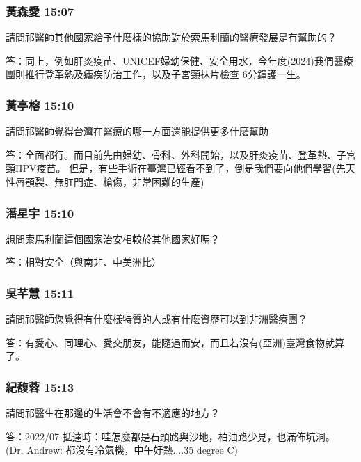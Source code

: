 \documentclass[aspectratio=169]{beamer}
\begin{document}
\begin{frame}
\frametitle{黃森愛 15:07}
請問祁醫師其他國家給予什麼樣的協助對於索馬利蘭的醫療發展是有幫助的？

答：同上，例如肝炎疫苗、UNICEF婦幼保健、安全用水，今年度(2024)我們醫療團則推行登革熱及瘧疾防治工作，以及子宮頸抹片檢查 6分鐘護一生。
\end{frame}

\begin{frame}
\frametitle{黃亭榕 15:10}
請問祁醫師覺得台灣在醫療的哪一方面還能提供更多什麼幫助

答：全面都行。而目前先由婦幼、骨科、外科開始，以及肝炎疫苗、登革熱、子宮頸HPV疫苗。
但是，有些手術在臺灣已經看不到了，倒是我們要向他們學習(先天性唇顎裂、無肛門症、槍傷，非常困難的生產)
\end{frame}

\begin{frame}
\frametitle{潘星宇 15:10}
想問索馬利蘭這個國家治安相較於其他國家好嗎？

答：相對安全（與南非、中美洲比）
\end{frame}

\begin{frame}
\frametitle{吳芊慧 15:11}
請問祁醫師您覺得有什麼樣特質的人或有什麼資歷可以到非洲醫療團？

答：有愛心、同理心、愛交朋友，能隨遇而安，而且若沒有(亞洲)臺灣食物就算了。
\end{frame}

\begin{frame}
\frametitle{紀馥蓉 15:13}
請問祁醫生在那邊的生活會不會有不適應的地方？

答：2022/07 抵達時：哇怎麼都是石頭路與沙地，柏油路少見，也滿佈坑洞。\\
(Dr. Andrew: 都沒有冷氣機，中午好熱....35 degree C)
\end{frame}
\end{document}
